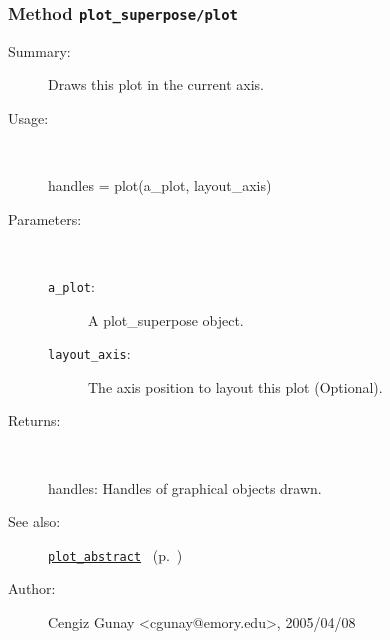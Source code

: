 \subsubsection[Method \texttt{plot}]{Method \texttt{plot\_superpose/plot}}%
%
\label{ref_plot_superpose__plot}%
\hypertarget{ref_plot_superpose__plot}{}%
\begin{description}
\item[Summary:]Draws this plot in the current axis.
%
\item[Usage:]~%
\begin{lyxcode}%
handles = plot(a\_plot, layout\_axis)
%
\end{lyxcode}%
%
%
\item[Parameters:]~
\begin{description}%
\item[\texttt{a\_plot}:]
 A plot\_superpose object.
\item[\texttt{layout\_axis}:]
 The axis position to layout this plot (Optional). 
\end{description}%
%
\item[Returns:]~

	handles: Handles of graphical objects drawn.
%
%
\item[See also:]%
\hyperlink{ref_plot_abstract}{\texttt{plot\_abstract}}%
\ (p.~\pageref{ref_plot_abstract})%
%
%
\item[Author:]%
Cengiz Gunay <cgunay@emory.edu>, 2005/04/08%
\end{description}
\methodline%
